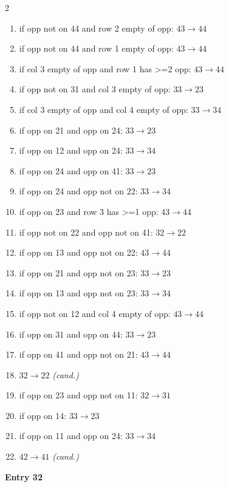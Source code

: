 \begin{multicols}{2}
\begin{tikzpicture}[scale=0.24]
\end{tikzpicture}
\nopagebreak\begin{enumerate}[topsep=1pt,itemsep=0pt,parsep=0pt,leftmargin=2.2em,label=\arabic*.]
\item if opp not on 44 and row 2 empty of opp: $43\!\to\!44$
\item if opp not on 44 and row 1 empty of opp: $43\!\to\!44$
\item if col 3 empty of opp and row 1 has >=2 opp: $43\!\to\!44$
\item if opp not on 31 and col 3 empty of opp: $33\!\to\!23$
\item if col 3 empty of opp and col 4 empty of opp: $33\!\to\!34$
\item if opp on 21 and opp on 24: $33\!\to\!23$
\item if opp on 12 and opp on 24: $33\!\to\!34$
\item if opp on 24 and opp on 41: $33\!\to\!23$
\item if opp on 24 and opp not on 22: $33\!\to\!34$
\item if opp on 23 and row 3 has >=1 opp: $43\!\to\!44$
\item if opp not on 22 and opp not on 41: $32\!\to\!22$
\item if opp on 13 and opp not on 22: $43\!\to\!44$
\item if opp on 21 and opp not on 23: $33\!\to\!23$
\item if opp on 13 and opp not on 23: $33\!\to\!34$
\item if opp not on 12 and col 4 empty of opp: $43\!\to\!44$
\item if opp on 31 and opp on 44: $33\!\to\!23$
\item if opp on 41 and opp not on 21: $43\!\to\!44$
\item $32\!\to\!22$ \hfill\textit{(cand.)}
\item if opp on 23 and opp not on 11: $32\!\to\!31$
\item if opp on 14: $33\!\to\!23$
\item if opp on 11 and opp on 24: $33\!\to\!34$
\item $42\!\to\!41$ \hfill\textit{(cand.)}
\end{enumerate}\smallskip
\noindent\textbf{Entry 32} \; 
\end{multicols}
